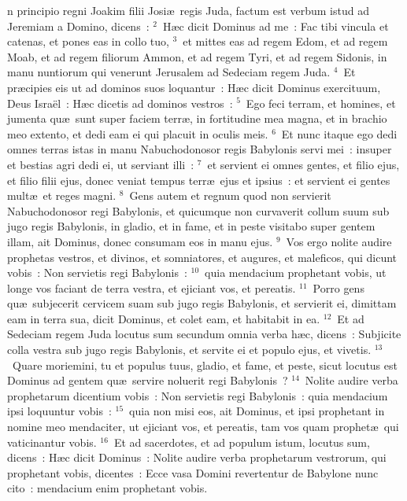 \bchapter
{}n principio regni Joakim filii Josi\ae\ regis Juda, factum est verbum istud ad Jeremiam a Domino, dicens~:
${}^{2}$~H\ae c dicit Dominus ad me~: Fac tibi vincula et catenas, et pones eas in collo tuo,
${}^{3}$~et mittes eas ad regem Edom, et ad regem Moab, et ad regem filiorum Ammon, et ad regem Tyri, et ad regem Sidonis, in manu nuntiorum qui venerunt Jerusalem ad Sedeciam regem Juda.
${}^{4}$~Et pr\ae cipies eis ut ad dominos suos loquantur~: H\ae c dicit Dominus exercituum, Deus Isra\"el~: H\ae c dicetis ad dominos vestros~:
${}^{5}$~Ego feci terram, et homines, et jumenta qu\ae\ sunt super faciem terr\ae , in fortitudine mea magna, et in brachio meo extento, et dedi eam ei qui placuit in oculis meis.
${}^{6}$~Et nunc itaque ego dedi omnes terras istas in manu Nabuchodonosor regis Babylonis servi mei~: insuper et bestias agri dedi ei, ut serviant illi~:
${}^{7}$~et servient ei omnes gentes, et filio ejus, et filio filii ejus, donec veniat tempus terr\ae\ ejus et ipsius~: et servient ei gentes mult\ae\ et reges magni.
${}^{8}$~Gens autem et regnum quod non servierit Nabuchodonosor regi Babylonis, et quicumque non curvaverit collum suum sub jugo regis Babylonis, in gladio, et in fame, et in peste visitabo super gentem illam, ait Dominus, donec consumam eos in manu ejus.
${}^{9}$~Vos ergo nolite audire prophetas vestros, et divinos, et somniatores, et augures, et maleficos, qui dicunt vobis~: Non servietis regi Babylonis~:
${}^{10}$~quia mendacium prophetant vobis, ut longe vos faciant de terra vestra, et ejiciant vos, et pereatis.
${}^{11}$~Porro gens qu\ae\ subjecerit cervicem suam sub jugo regis Babylonis, et servierit ei, dimittam eam in terra sua, dicit Dominus, et colet eam, et habitabit in ea.
${}^{12}$~Et ad Sedeciam regem Juda locutus sum secundum omnia verba h\ae c, dicens~: Subjicite colla vestra sub jugo regis Babylonis, et servite ei et populo ejus, et vivetis.
${}^{13}$~Quare moriemini, tu et populus tuus, gladio, et fame, et peste, sicut locutus est Dominus ad gentem qu\ae\ servire noluerit regi Babylonis~?
${}^{14}$~Nolite audire verba prophetarum dicentium vobis~: Non servietis regi Babylonis~: quia mendacium ipsi loquuntur vobis~:
${}^{15}$~quia non misi eos, ait Dominus, et ipsi prophetant in nomine meo mendaciter, ut ejiciant vos, et pereatis, tam vos quam prophet\ae\ qui vaticinantur vobis.
${}^{16}$~Et ad sacerdotes, et ad populum istum, locutus sum, dicens~: H\ae c dicit Dominus~: Nolite audire verba prophetarum vestrorum, qui prophetant vobis, dicentes~: Ecce vasa Domini revertentur de Babylone nunc cito~: mendacium enim prophetant vobis.
